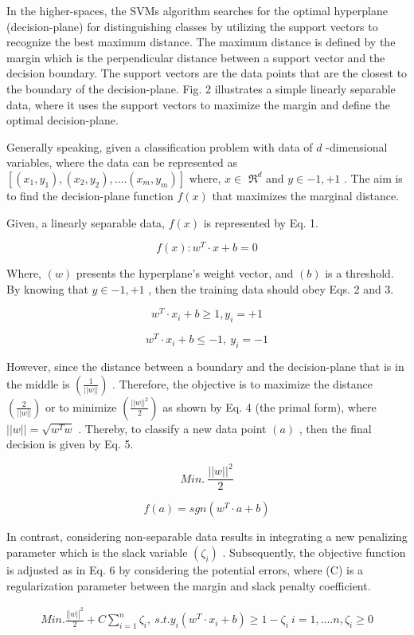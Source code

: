 \documentclass{article}
\begin{document}
In the higher-spaces, the SVMs algorithm searches for the optimal hyperplane (decision-plane) for distinguishing classes by utilizing the support vectors to recognize the best maximum distance. The maximum distance is defined by the margin which is the perpendicular distance between a support vector and the decision boundary. The support vectors are the data points that are the closest to the boundary of the decision-plane. Fig. 2 illustrates a simple linearly separable data, where it uses the support vectors to maximize the margin and define the optimal decision-plane.


Generally speaking, given a classification problem with data of $d$ -dimensional variables, where the data can be represented as $[(x_{1},y_{1}),(x_{2},y_{2}),....(x_{m},y_{m})]$ where, $x\in$ $\Re^{d}$ and $y\in{-1,+1}$ . The aim is to find the decision-plane function $f(x)$ that maximizes the marginal distance.


Given, a linearly separable data, $f(x)$ is represented by Eq. 1.


\[
f(x):w^{T}\cdot x+b=0
\]


Where, $(w)$ presents the hyperplane’s weight vector, and $(b)$ is a threshold. By knowing that $y\in{-1,+1}$ , then the training data should obey Eqs. 2 and 3.


\[
w^{T}\cdot x_{i}+b\geq1,y_{i}=+1
\]


\[
w^{T}\cdot x_{i}+b\leq-1,~y_{i}=-1
\]


However, since the distance between a boundary and the decision-plane that is in the middle is $\left({\frac{1}{\left|\left|w\right|\right|}}\right)$ . Therefore, the objective is to maximize the distance $\left({\frac{2}{\left|\left|w\right|\right|}}\right)$ or to minimize $\left({\frac{||w||^{2}}{2}}\right)$ as shown by Eq. 4 (the primal form), where $||w||=\sqrt{w^{T}w}$ . Thereby, to classify a new data point $(a)$ , then the final decision is given by Eq. 5.


\[
M i n.~\frac{||w||^{2}}{2}
\]


\[
f(a)=s g n(w^{T}\cdot a+b)
\]


In contrast, considering non-separable data results in integrating a new penalizing parameter which is the slack variable $(\zeta_{i})$ . Subsequently, the objective function is adjusted as in Eq. 6 by considering the potential errors, where (C) is a regularization parameter between the margin and slack penalty coefficient.


\[
\begin{array}{c}{{M i n.\frac{\lvert|w\rvert|^{2}}{2}+C\displaystyle\sum_{i=1}^{n}\zeta_{i},}}\ {{s.t.y_{i}(w^{T}\cdot x_{i}+b)\geq1-\zeta_{i}}}\ {{i=1,....n,\zeta_{i}\geq0}}\end{array}
\]
\end{document}
